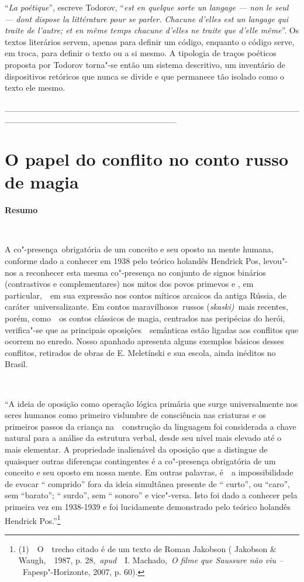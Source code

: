 ``\emph{La poétique}'', escreve Todorov, ``\emph{est en quelque sorte un
langage --- non le seul --- dont dispose la littérature pour se parler.
Chacune d'elles est un langage qui traite de l'autre; et en même temps
chacune d'elles ne traite que d'elle même}''. Os textos literários
servem, apenas para definir um código, enquanto o código serve, em
troca, para definir o texto ou a si mesmo. A tipologia de traços
poéticos proposta por Todorov torna"-se então um sistema descritivo, um
inventário de dispositivos retóricos que nunca se divide e que permanece
tão isolado como o texto ele mesmo.

\_\_\_\_\_\_\_\_\_\_\_\_\_\_\_\_\_\_\_\_\_\_\_\_\_\_\_\_\_\_\_\_\_\_\_\_\_\_\_\_\_\_\_\_\_\_\_\_\_\_\_\_\_\_\_\_\_\_\_\_\_\_\_\_\_\_\_\_\_\_\_\_\_\_\_\_

\chapter{O papel do conflito no conto russo de magia}

\textbf{Resumo}

\textbf{~}

A co"-presença~obrigatória de um conceito e seu oposto na mente humana,
conforme dado a conhecer em 1938 pelo teórico holandês Hendrick Pos,
levou"-nos a reconhecer esta mesma co"-presença no conjunto de signos
binários (contrastivos e complementares) nos mitos dos povos primevos e
, em particular,~~em sua expressão nos contos míticos arcaicos da antiga
Rússia, de caráter~universalizante. Em contos maravilhosos~russos
(\emph{skaski)~}mais recentes, porém, como~~os contos clássicos de
magia, centrados nas peripécias do herói, verifica"-se que as principais
oposições~~semânticas estão ligadas aos conflitos que ocorrem no enredo.
Nosso apanhado apresenta alguns exemplos básicos desses conflitos,
retirados de obras de E. Meletínski e sua escola, ainda inéditos no
Brasil.

\textbf{~}

``A ideia de oposição como operação lógica primária que surge
universalmente nos seres humanos como primeiro vislumbre de consciência
nas criaturas e os primeiros passos da criança na~~construção da
linguagem foi considerada a chave natural para a análise da estrutura
verbal, desde seu nível mais elevado até o mais elementar. A propriedade
inalienável da oposição que a distingue de quaisquer outras diferenças
contingentes é a co"-presença obrigatória de um conceito e seu oposto em
nossa mente. Em outras palavras, é~~a impossibilidade de evocar ``
comprido'' fora da ideia simultânea presente de `` curto'', ou ``caro'',
sem ``barato''; `` surdo'', sem `` sonoro'' e vice"-versa. Isto foi dado
a conhecer pela primeira vez em 1938-1939 e foi lucidamente demonstrado
pelo teórico holandês Hendrick Pos.''\footnote{(1)~~O~~trecho citado é
  de um texto de Roman Jakobson ( Jakobson \& Waugh,~~1987, p.
  28,~\emph{apud}~~I. Machado,~\emph{O filme que Saussure não viu
  --~}Fapesp"-Horizonte, 2007, p. 60).}

